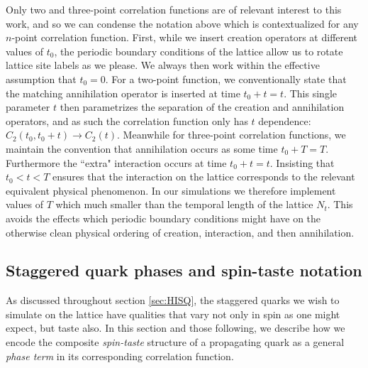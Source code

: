 Only two and three-point correlation functions are of relevant interest to this work, and so we can condense the notation above which is contextualized for any $n$-point correlation function.  First, while we insert creation operators at different values of $t_0$, the periodic boundary conditions of the lattice allow us to rotate lattice site labels as we please.  We always then work within the effective assumption that $t_0 = 0$.  For a two-point function, we conventionally state that the matching annihilation operator is inserted at time $t_0+t = t$.  This single parameter $t$ then parametrizes the separation of the creation and annihilation operators, and as such the correlation function only has $t$ dependence: $C_2(t_0, t_0 + t)\rightarrow C_2(t)$.  Meanwhile for three-point correlation functions, we maintain the convention that annihilation occurs as some time $t_0 + T = T$.  Furthermore the ``extra" interaction %
occurs at time $t_0+t=t$.  Insisting that $t_0 < t < T$ ensures that the interaction on the lattice corresponds to the relevant equivalent physical phenomenon.  In our simulations we therefore implement values of $T$ which much smaller than the temporal length of the lattice $N_t$.  This avoids the effects which periodic boundary conditions might have on the otherwise clean physical ordering of creation, interaction, and then annihilation.

\subsection{Staggered quark phases and spin-taste notation}\label{sec:phase_and_spin-taste}
As discussed throughout section \ref{sec:HISQ}, the staggered quarks we wish to simulate on the lattice have qualities that vary not only in spin as one might expect, but taste also.  In this section and those following, we describe how we encode the composite \textit{spin-taste} structure of a propagating quark as a general \textit{phase term} in its corresponding correlation function.  

